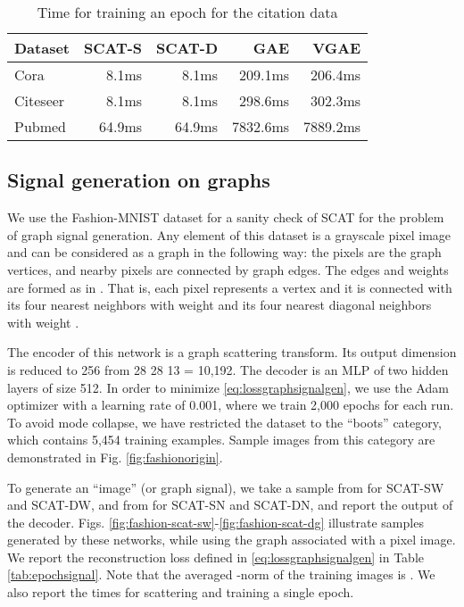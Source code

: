\documentclass[conference]{IEEEtran}
\begin{document}
\begin{table}[ht]
\caption{Time for training an epoch for the citation data}\label{tab:epochlink}
\centering
\begin{tabular}{lrrrr}
Dataset    &   SCAT-S    &    SCAT-D    &    GAE & VGAE    \\
\hline
Cora    &   8.1ms    &  8.1ms     &      209.1ms & 206.4ms      \\
Citeseer     &  8.1ms     &  8.1ms    &   298.6ms   & 302.3ms  \\
Pubmed    &  64.9ms     &  64.9ms     &  7832.6ms    &  7889.2ms   \\
\end{tabular}
\end{table}







\subsection{Signal generation on graphs}\label{subsec:graphsignalgen}


We use the Fashion-MNIST dataset \cite{xiao2017fashion} for a sanity check of SCAT for the problem of graph signal generation. 
Any element of this dataset is a  grayscale pixel image and can be considered as a graph in the following way: the pixels are the graph vertices, and nearby pixels are connected by graph edges. 
The edges and weights are formed as in \cite{zou2018graph}. That is, each pixel represents a vertex and it is connected with its four nearest neighbors with weight  and its four nearest diagonal neighbors with weight .

The encoder of this network is a graph scattering transform. Its output dimension is reduced to 256 from 28  28  13 = 10,192. The decoder is an MLP of two hidden layers of size 512. In order to minimize \eqref{eq:lossgraphsignalgen}, we use the Adam optimizer with a learning rate of 0.001, where we train 2,000 epochs for each run. {To avoid mode collapse,} we have restricted the dataset to the ``boots'' category, which contains 5,454 training examples. Sample images from this category are demonstrated in Fig. \ref{fig:fashionorigin}. 




To generate an ``image'' (or graph signal), we take a sample  from  for SCAT-SW and SCAT-DW, and from  for SCAT-SN and SCAT-DN, and report the output of the decoder. 
Figs. \ref{fig:fashion-scat-sw}-\ref{fig:fashion-scat-dg} illustrate samples generated by these networks, while using the graph associated with a  pixel image. We report the  reconstruction loss defined in \eqref{eq:lossgraphsignalgen} in Table \ref{tab:epochsignal}. Note that the averaged -norm of the training images is . We also report the times for scattering and training a single epoch. 
\end{document}
